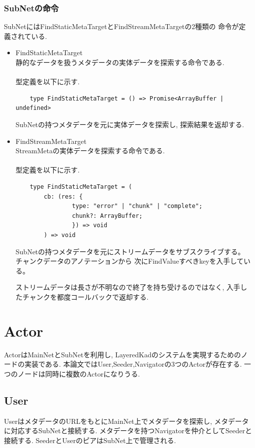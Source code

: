 \documentclass[sotsuron]{jcsie}
\begin{document}
\subsubsection{SubNetの命令}
SubNetにはFindStaticMetaTargetとFindStreamMetaTargetの2種類の
命令が定義されている.
\begin{itemize}
	\item {FindStaticMetaTarget}\\
	      静的なデータを扱うメタデータの実体データを探索する命令である.
	      \\\\
	      型定義を以下に示す.
	      \begin{lstlisting}
	type FindStaticMetaTarget = () => Promise<ArrayBuffer | undefined>
	      \end{lstlisting}
	      SubNetの持つメタデータを元に実体データを探索し,
	      探索結果を返却する.
	      \\
	\item {FindStreamMetaTarget}\\
	      StreamMetaの実体データを探索する命令である.
	      \\\\
	      型定義を以下に示す.
	      \begin{lstlisting}
	type FindStaticMetaTarget = (
		cb: (res: {
				type: "error" | "chunk" | "complete";
				chunk?: ArrayBuffer;
				}) => void
		) => void
	      \end{lstlisting}
	      SubNetの持つメタデータを元にストリームデータをサブスクライブする。
	      チャンクデータのアノテーションから
	      次にFindValueすべきkeyを入手している。
	      	      	
	      ストリームデータは長さが不明なので終了を持ち受けるのではなく,
	      入手したチャンクを都度コールバックで返却する.
\end{itemize}

\section{Actor}
ActorはMainNetとSubNetを利用し,
LayeredKadのシステムを実現するためのノードの実装である.
本論文ではUser,Seeder,Navigatorの3つのActorが存在する.
一つのノードは同時に複数のActorになりうる.

\subsection{User}
UserはメタデータのURLをもとにMainNet上でメタデータを探索し,
メタデータに対応するSubNetと接続する.
メタデータを持つNavigatorを仲介としてSeederと接続する.
SeederとUserのピアはSubNet上で管理される.
\end{document}
